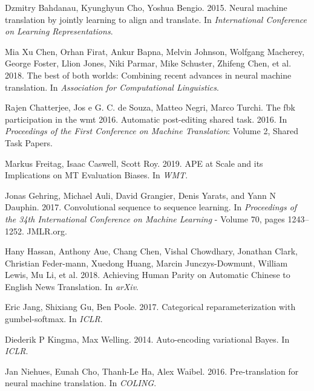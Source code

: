\documentclass{article}
\begin{document}
\begin{enumerate}[label={[\arabic*]}, leftmargin=0.55cm]
  \item Dzmitry Bahdanau, Kyunghyun Cho, Yoshua Bengio. 2015. Neural machine translation by jointly learning to align and translate. In \textit{International Conference on Learning Representations}.
  \label{itm:bahdanau}

  \item Mia Xu Chen, Orhan Firat, Ankur Bapna, Melvin Johnson, Wolfgang Macherey, George Foster, Llion Jones, Niki Parmar, Mike Schuster, Zhifeng Chen, et al. 2018. The best of both worlds: Combining recent advances in neural machine translation. In \textit{Association for Computational Linguistics}.
  \label{itm:the_best_of_both_worlds}

  \item Rajen Chatterjee, Jos e G. C. de Souza, Matteo Negri, Marco Turchi. The fbk participation in the wmt 2016. Automatic post-editing shared task. 2016. In \textit{Proceedings of the First Conference on Machine Translation}: Volume 2, Shared Task Papers.
  \label{itm:post_editing_shared_text}

  \item Markus Freitag, Isaac Caswell, Scott Roy. 2019. APE at Scale and its Implications on MT Evaluation Biases. In \textit{WMT}.
  \label{itm:ape}

  \item Jonas Gehring, Michael Auli, David Grangier, Denis Yarats, and Yann N Dauphin. 2017. Convolutional sequence to sequence learning. In \textit{Proceedings of the 34th International Conference on Machine Learning} - Volume 70, pages 1243–1252. JMLR.org.
  \label{itm:conv_seq2seq}

  \item Hany Hassan, Anthony Aue, Chang Chen, Vishal Chowdhary, Jonathan Clark, Christian Feder-mann, Xuedong Huang, Marcin Junczys-Dowmunt, William Lewis, Mu Li, et al. 2018. Achieving Human Parity on Automatic Chinese to English News Translation. In \textit{arXiv}.
  \label{itm:human_parity}

  \item Eric Jang, Shixiang Gu, Ben Poole. 2017. Categorical reparameterization with gumbel-softmax. In \textit{ICLR}.
  \label{itm:gumbel}

  \item Diederik P Kingma, Max Welling. 2014. Auto-encoding variational Bayes. In \textit{ICLR}.
  \label{itm:vae}

  \item Jan Niehues, Eunah Cho, Thanh-Le Ha, Alex Waibel. 2016. Pre-translation for neural machine translation. In \textit{COLING}.
  \label{itm:pre_translation}


\end{enumerate}
\end{document}
